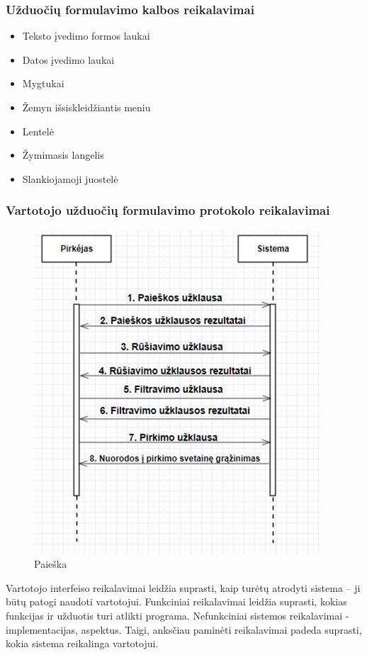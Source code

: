 \documentclass{VUMIFPSkursinis}
\begin{document}
\subsubsection{Užduočių formulavimo kalbos reikalavimai}
\begin{itemize}
  \item Teksto įvedimo formos laukai
  \item Datos įvedimo laukai
  \item Mygtukai
  \item Žemyn išsiskleidžiantis meniu
  \item Lentelė
  \item Žymimasis langelis
  \item Slankiojamoji juostelė
\end{itemize}

\subsubsection{Vartotojo užduočių formulavimo protokolo reikalavimai}
\begin{figure}[H]
  \centering
  \includegraphics[scale=1]{img/paieska1}
  \caption{Paieška}
  \label{paieska}
\end{figure}

Vartotojo interfeiso reikalavimai leidžia suprasti, kaip turėtų atrodyti sistema – ji būtų patogi naudoti vartotojui. Funkciniai reikalavimai leidžia suprasti, kokias funkcijas ir užduotis turi atlikti programa. Nefunkciniai sistemos reikalavimai - implementacijas, aspektus. Taigi, anksčiau paminėti reikalavimai padeda suprasti, kokia sistema reikalinga vartotojui.
\end{document}
